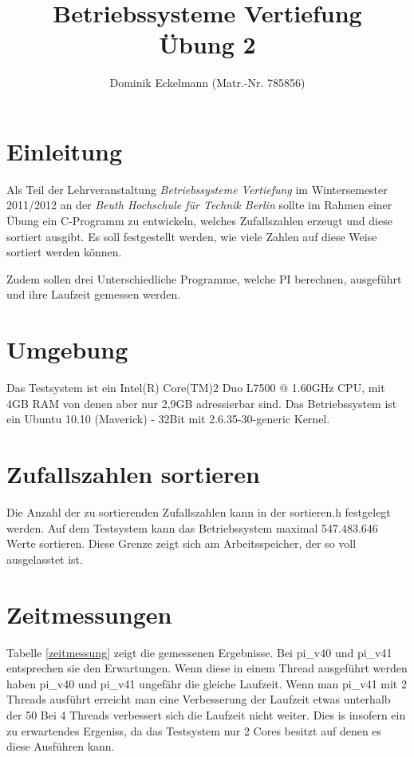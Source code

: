 \documentclass[12pt,a4paper]{article}
\author{Dominik Eckelmann (Matr.-Nr. 785856)}
\title{Betriebssysteme Vertiefung\\Übung 2}
\date{}
\begin{document}
\maketitle

\section{Einleitung}
Als Teil der Lehrveranstaltung \textit{Betriebssysteme Vertiefung} im Wintersemester 2011/2012 an der \textit{Beuth Hochschule für Technik Berlin} sollte im Rahmen einer Übung ein C-Programm zu
entwickeln, welches Zufallszahlen erzeugt und diese sortiert ausgibt. Es soll festgestellt
werden, wie viele Zahlen auf diese Weise sortiert werden können.

Zudem sollen drei Unterschiedliche Programme, welche PI berechnen, ausgeführt und ihre Laufzeit
gemessen werden.

\section{Umgebung}
Das Testsystem ist ein Intel(R) Core(TM)2 Duo L7500 @ 1.60GHz CPU, mit 4GB RAM von denen aber nur 2,9GB adressierbar sind.
Das Betriebssystem ist ein Ubuntu 10.10 (Maverick) - 32Bit mit 2.6.35-30-generic Kernel.

\section{Zufallszahlen sortieren}
Die Anzahl der zu sortierenden Zufallszahlen kann in der sortieren.h festgelegt werden.
Auf dem Testsystem kann das Betriebssystem maximal 547.483.646 Werte sortieren.
Diese Grenze zeigt sich am Arbeitsspeicher, der so voll ausgelasstet ist.

\section{Zeitmessungen}

Tabelle \ref{zeitmessung} zeigt die gemessenen Ergebnisse.
Bei pi\_v40 und pi\_v41 entsprechen sie den Erwartungen.
Wenn diese in einem Thread ausgeführt werden haben pi\_v40 und pi\_v41
ungefähr die gleiche Laufzeit. Wenn man pi\_v41 mit 2 Threads ausführt
erreicht man eine Verbesserung der Laufzeit etwas unterhalb der 50%
Bei 4 Threads verbessert sich die Laufzeit nicht weiter. Dies is insofern
ein zu erwartendes Ergeniss, da das Testsystem nur 2 Cores besitzt auf denen
es diese Ausführen kann.
\end{document}
